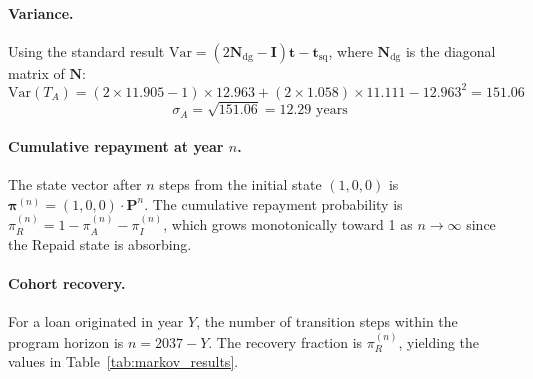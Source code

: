 \documentclass[11pt, letterpaper]{article}
\begin{document}
\paragraph{Variance.} Using the standard result $\text{Var} = (2\mathbf{N}_{\text{dg}} - \mathbf{I})\mathbf{t} - \mathbf{t}_{\text{sq}}$, where $\mathbf{N}_{\text{dg}}$ is the diagonal matrix of $\mathbf{N}$:
\[
  \text{Var}(T_A) = (2 \times 11.905 - 1) \times 12.963 + (2 \times 1.058) \times 11.111 - 12.963^2 = 151.06
\]
\[
  \sigma_A = \sqrt{151.06} = 12.29 \text{ years}
\]

\paragraph{Cumulative repayment at year $n$.} The state vector after $n$ steps from the initial state $(1, 0, 0)$ is $\boldsymbol{\pi}^{(n)} = (1, 0, 0) \cdot \mathbf{P}^n$. The cumulative repayment probability is $\pi_R^{(n)} = 1 - \pi_A^{(n)} - \pi_I^{(n)}$, which grows monotonically toward 1 as $n \to \infty$ since the Repaid state is absorbing.

\paragraph{Cohort recovery.} For a loan originated in year $Y$, the number of transition steps within the program horizon is $n = 2037 - Y$. The recovery fraction is $\pi_R^{(n)}$, yielding the values in Table~\ref{tab:markov_results}.
\end{document}
